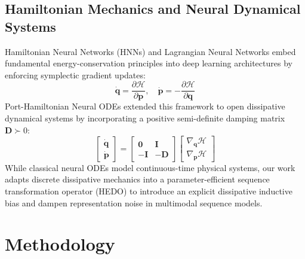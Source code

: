 \documentclass[11pt,journal,onecolumn,draftcls]{IEEEtran}
\begin{document}
\subsection{Hamiltonian Mechanics and Neural Dynamical Systems}
Hamiltonian Neural Networks (HNNs) \cite{greydanus2019hamiltonian} and Lagrangian Neural Networks \cite{cranmer2020lagrangian} embed fundamental energy-conservation principles into deep learning architectures by enforcing symplectic gradient updates:
\begin{equation}
\dot{\mathbf{q}} = \frac{\partial \mathcal{H}}{\partial \mathbf{p}}, \quad \dot{\mathbf{p}} = -\frac{\partial \mathcal{H}}{\partial \mathbf{q}}
\end{equation}
Port-Hamiltonian Neural ODEs \cite{port_hamiltonian_neural_odes} extended this framework to open dissipative dynamical systems by incorporating a positive semi-definite damping matrix $\mathbf{D} \succ 0$:
\begin{equation}
\begin{bmatrix} \dot{\mathbf{q}} \\ \dot{\mathbf{p}} \end{bmatrix} = \begin{bmatrix} \mathbf{0} & \mathbf{I} \\ -\mathbf{I} & -\mathbf{D} \end{bmatrix} \begin{bmatrix} \nabla_{\mathbf{q}} \mathcal{H} \\ \nabla_{\mathbf{p}} \mathcal{H} \end{bmatrix}
\end{equation}
While classical neural ODEs model continuous-time physical systems, our work adapts discrete dissipative mechanics into a parameter-efficient sequence transformation operator (HEDO) to introduce an explicit dissipative inductive bias and dampen representation noise in multimodal sequence models.

\section{Methodology}
\label{sec:methodology}
\end{document}

